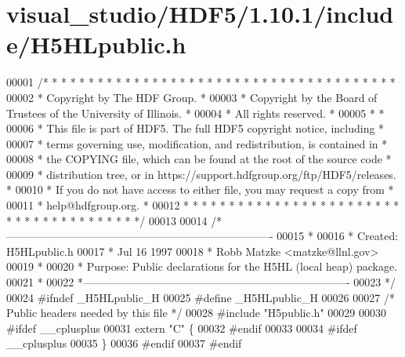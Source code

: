 \hypertarget{visual__studio_2_h_d_f5_21_810_81_2include_2_h5_h_lpublic_8h_source}{}\section{visual\+\_\+studio/\+H\+D\+F5/1.10.1/include/\+H5\+H\+Lpublic.h}
\label{visual__studio_2_h_d_f5_21_810_81_2include_2_h5_h_lpublic_8h_source}

\begin{DoxyCode}
00001 \textcolor{comment}{/* * * * * * * * * * * * * * * * * * * * * * * * * * * * * * * * * * * * * * *}
00002 \textcolor{comment}{ * Copyright by The HDF Group.                                               *}
00003 \textcolor{comment}{ * Copyright by the Board of Trustees of the University of Illinois.         *}
00004 \textcolor{comment}{ * All rights reserved.                                                      *}
00005 \textcolor{comment}{ *                                                                           *}
00006 \textcolor{comment}{ * This file is part of HDF5.  The full HDF5 copyright notice, including     *}
00007 \textcolor{comment}{ * terms governing use, modification, and redistribution, is contained in    *}
00008 \textcolor{comment}{ * the COPYING file, which can be found at the root of the source code       *}
00009 \textcolor{comment}{ * distribution tree, or in https://support.hdfgroup.org/ftp/HDF5/releases.  *}
00010 \textcolor{comment}{ * If you do not have access to either file, you may request a copy from     *}
00011 \textcolor{comment}{ * help@hdfgroup.org.                                                        *}
00012 \textcolor{comment}{ * * * * * * * * * * * * * * * * * * * * * * * * * * * * * * * * * * * * * * */}
00013 
00014 \textcolor{comment}{/*-------------------------------------------------------------------------}
00015 \textcolor{comment}{ *}
00016 \textcolor{comment}{ * Created:             H5HLpublic.h}
00017 \textcolor{comment}{ *                      Jul 16 1997}
00018 \textcolor{comment}{ *                      Robb Matzke <matzke@llnl.gov>}
00019 \textcolor{comment}{ *}
00020 \textcolor{comment}{ * Purpose:             Public declarations for the H5HL (local heap) package.}
00021 \textcolor{comment}{ *}
00022 \textcolor{comment}{ *-------------------------------------------------------------------------}
00023 \textcolor{comment}{ */}
00024 \textcolor{preprocessor}{#ifndef \_H5HLpublic\_H}
00025 \textcolor{preprocessor}{#define \_H5HLpublic\_H}
00026 
00027 \textcolor{comment}{/* Public headers needed by this file */}
00028 \textcolor{preprocessor}{#include "H5public.h"}
00029 
00030 \textcolor{preprocessor}{#ifdef \_\_cplusplus}
00031 \textcolor{keyword}{extern} \textcolor{stringliteral}{"C"} \{
00032 \textcolor{preprocessor}{#endif}
00033 
00034 \textcolor{preprocessor}{#ifdef \_\_cplusplus}
00035 \}
00036 \textcolor{preprocessor}{#endif}
00037 \textcolor{preprocessor}{#endif}
\end{DoxyCode}
